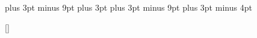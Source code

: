\titlespacing{\chapter}{0pt}{\parskip}{-\parskip}
\titlespacing{\section}{0pt}{\parskip}{-\parskip}
\titlespacing{\subsection}{0pt}{\parskip}{-\parskip}
\titlespacing{\subsubsection}{0pt}{\parskip}{-\parskip}

\abovedisplayskip=12pt plus 3pt minus 9pt
\abovedisplayshortskip=0pt plus 3pt
\belowdisplayskip=12pt plus 3pt minus 9pt
\belowdisplayshortskip=7pt plus 3pt minus 4pt

\renewcommand{\theenumi}{\arabic{enumi}.} %
\renewcommand{\labelenumi}{\arabic{enumi}.} %
\renewcommand{\theenumii}{\arabic{enumii}.} %
\renewcommand{\labelenumii}{\arabic{enumi}.\arabic{enumii}.}%
\renewcommand{\theenumiii}{\arabic{enumiii}} %
\renewcommand{\labelenumiii}{\arabic{enumi}.\arabic{enumii}.\arabic{enumiii}.}%

\renewcommand{\thechapter}{\arabic{chapter}.}
\renewcommand{\thesection}{\thechapter\arabic{section}.}
\renewcommand{\thesubsection}{\thechapter\arabic{subsection}.}
\renewcommand{\thetable}{\arabic{table}}
\renewcommand{\thefigure}{\arabic{figure}}
\renewcommand{\theequation}{\arabic{equation}} %

\addto{}

\newcommand{\changefont}{%
    \fontsize{14pt}{14pt}\selectfont
}

\usepackage{fancyhdr}
\pagestyle{fancy} {%
	\fancyhf{}
	\fancyhead[CE,CO]{\changefont \thepage}
}

\renewcommand{\headrulewidth}{0pt}
\renewcommand{\footrulewidth}{0pt}

\fancypagestyle{plain}{%
	\fancyhf{}
	\fancyhead[CE,CO]{\changefont \thepage}
}

\titleformat{\section}[runin]{}{}{}{}[]

